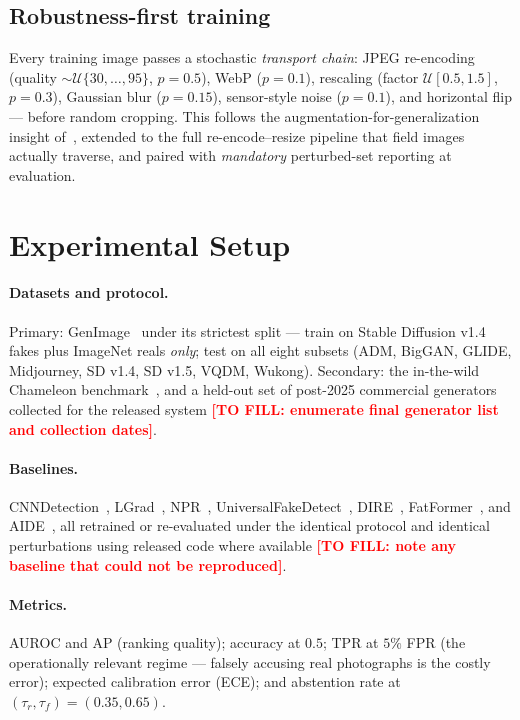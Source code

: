 \documentclass[10pt,twocolumn]{article}
\newcommand{\tofill}[1]{\textcolor{red}{\textbf{[TO FILL: #1]}}}
\begin{document}
\subsection{Robustness-first training}
\label{sec:protocol}
Every training image passes a stochastic \emph{transport chain}: JPEG
re-encoding (quality $\sim\mathcal{U}\{30,\dots,95\}$, $p{=}0.5$), WebP
($p{=}0.1$), rescaling (factor $\mathcal{U}[0.5,1.5]$, $p{=}0.3$), Gaussian
blur ($p{=}0.15$), sensor-style noise ($p{=}0.1$), and horizontal flip ---
before random cropping. This follows the augmentation-for-generalization
insight of~\cite{wang2020cnn}, extended to the full re-encode--resize
pipeline that field images actually traverse, and paired with
\emph{mandatory} perturbed-set reporting at evaluation.

\section{Experimental Setup}
\paragraph{Datasets and protocol.} Primary: GenImage~\cite{zhu2023genimage}
under its strictest split --- train on Stable Diffusion v1.4 fakes plus
ImageNet reals \emph{only}; test on all eight subsets (ADM, BigGAN, GLIDE,
Midjourney, SD v1.4, SD v1.5, VQDM, Wukong). Secondary: the in-the-wild
Chameleon benchmark~\cite{yan2025sanity}, and a held-out set of
post-2025 commercial generators collected for the released
system \tofill{enumerate final generator list and collection dates}.

\paragraph{Baselines.} CNNDetection~\cite{wang2020cnn},
LGrad~\cite{tan2023lgrad}, NPR~\cite{tan2024npr},
UniversalFakeDetect~\cite{ojha2023universal}, DIRE~\cite{wang2023dire},
FatFormer~\cite{liu2024fatformer}, and AIDE~\cite{yan2025sanity}, all
retrained or re-evaluated under the identical protocol and identical
perturbations using released code where available
\tofill{note any baseline that could not be reproduced}.

\paragraph{Metrics.} AUROC and AP (ranking quality); accuracy at $0.5$;
TPR at $5\%$ FPR (the operationally relevant regime --- falsely accusing
real photographs is the costly error); expected calibration error (ECE);
and abstention rate at $(\tau_r,\tau_f) = (0.35, 0.65)$.
\end{document}
